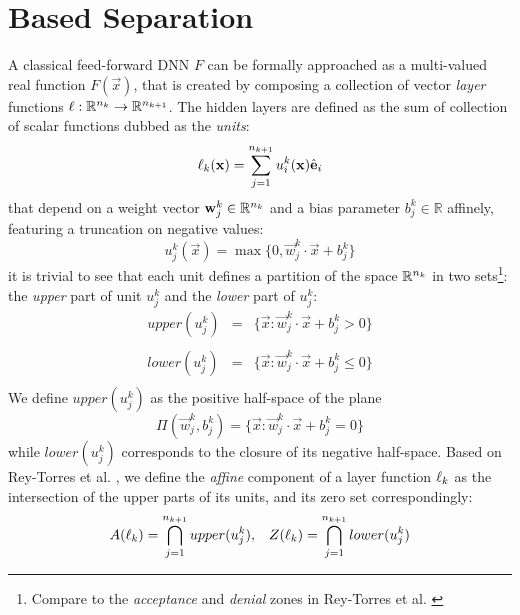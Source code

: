 \section{\ReLU Based Separation}\label{sec:separability}
A classical feed-forward DNN $F$ can be formally approached as a multi-valued real function $F(\vec{x})$, that is created by composing a collection of vector \emph{layer} functions $\ell:\mathbb{R}^{n_k}\rightarrow\mathbb{R}^{n_{k+1}}$. The hidden layers are defined as the sum of collection of scalar functions dubbed as the \emph{units}: 
\begin{equation}\label{eq:layer}
\ell_k(\mathbf{x}) = \sum^{n_{k+1}}_{j=1} u_i^k(\mathbf{x}) \hat{\textbf{e}}_i
\end{equation}
that depend on a weight vector $\mathbf{w}_j^k\in\mathbb{R}^{n_k}$ and a bias parameter $b_j^k\in\mathbb{R}$ affinely, featuring a truncation on negative values:
\begin{equation}\label{eq:unit}
u_j^k(\vec{x}) = \max\{0,\vec{w}_j^k \cdot \vec{x} + b_j^k\}
\end{equation}
it is trivial to see that each unit defines a partition of the space $\mathbb{R}^{n_k}$ in two sets\footnote{Compare to the \emph{acceptance} and \emph{denial} zones in Rey-Torres et al. \cite{reyRiera2019ModellingClassificationReLU}}: the \emph{upper} part of unit $u_j^k$ and the \emph{lower} part of $u_j^k$:
\begin{equation}\label{eq:upperAndLowerSets}
\begin{array}{lcl}
    upper(u_j^k) &=& \{\vec{x}:\vec{w}_j^k \cdot \vec{x} + b_j^k > 0\}\\\\
    lower(u_j^k) &=& \{\vec{x}:\vec{w}_j^k \cdot \vec{x} + b_j^k\leq 0\}\\
\end{array}
\end{equation}
We define $upper(u_j^k)$ as the positive half-space of the plane 
\begin{equation}\label{eq:separatingPlane}
    \Pi(\vec{w}_j^k,b_j^k) = 
    \{ 
     \vec{x}:\vec{w}_j^k\cdot\vec{x}+b_j^k =0
    \}
\end{equation}
while $lower(u_j^k)$ corresponds to the closure of its negative half-space. Based on Rey-Torres et al. \cite{reyRiera2019ModellingClassificationReLU}, we define the \emph{affine} component of a layer function $\ell_k$ as the intersection of the upper parts of its units, and its zero set correspondingly:
\begin{equation}\label{eq:affineCompAndZeroSet}
\begin{array}{cc}
    A(\ell_k) = \displaystyle\bigcap_{j=1}^{n_{k+1}}upper(u_j^k), &
    Z(\ell_k) = \displaystyle\bigcap_{j=1}^{n_{k+1}}lower(u_j^k)\\
    \end{array}
\end{equation}
